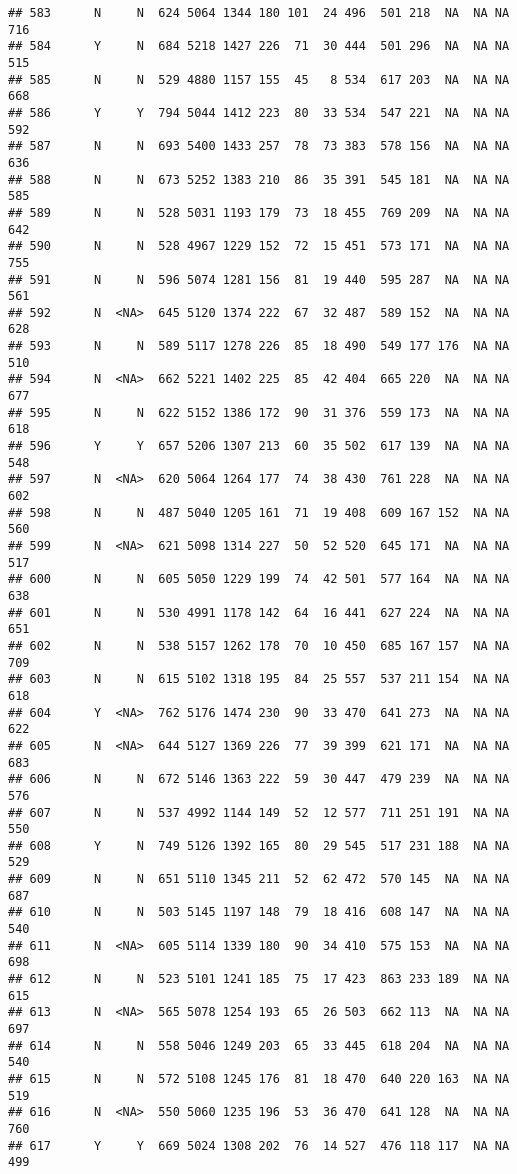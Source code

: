 \documentclass[]{article}
\begin{document}
\begin{verbatim}
## 583      N     N  624 5064 1344 180 101  24 496  501 218  NA  NA NA  716
## 584      Y     N  684 5218 1427 226  71  30 444  501 296  NA  NA NA  515
## 585      N     N  529 4880 1157 155  45   8 534  617 203  NA  NA NA  668
## 586      Y     Y  794 5044 1412 223  80  33 534  547 221  NA  NA NA  592
## 587      N     N  693 5400 1433 257  78  73 383  578 156  NA  NA NA  636
## 588      N     N  673 5252 1383 210  86  35 391  545 181  NA  NA NA  585
## 589      N     N  528 5031 1193 179  73  18 455  769 209  NA  NA NA  642
## 590      N     N  528 4967 1229 152  72  15 451  573 171  NA  NA NA  755
## 591      N     N  596 5074 1281 156  81  19 440  595 287  NA  NA NA  561
## 592      N  <NA>  645 5120 1374 222  67  32 487  589 152  NA  NA NA  628
## 593      N     N  589 5117 1278 226  85  18 490  549 177 176  NA NA  510
## 594      N  <NA>  662 5221 1402 225  85  42 404  665 220  NA  NA NA  677
## 595      N     N  622 5152 1386 172  90  31 376  559 173  NA  NA NA  618
## 596      Y     Y  657 5206 1307 213  60  35 502  617 139  NA  NA NA  548
## 597      N  <NA>  620 5064 1264 177  74  38 430  761 228  NA  NA NA  602
## 598      N     N  487 5040 1205 161  71  19 408  609 167 152  NA NA  560
## 599      N  <NA>  621 5098 1314 227  50  52 520  645 171  NA  NA NA  517
## 600      N     N  605 5050 1229 199  74  42 501  577 164  NA  NA NA  638
## 601      N     N  530 4991 1178 142  64  16 441  627 224  NA  NA NA  651
## 602      N     N  538 5157 1262 178  70  10 450  685 167 157  NA NA  709
## 603      N     N  615 5102 1318 195  84  25 557  537 211 154  NA NA  618
## 604      Y  <NA>  762 5176 1474 230  90  33 470  641 273  NA  NA NA  622
## 605      N  <NA>  644 5127 1369 226  77  39 399  621 171  NA  NA NA  683
## 606      N     N  672 5146 1363 222  59  30 447  479 239  NA  NA NA  576
## 607      N     N  537 4992 1144 149  52  12 577  711 251 191  NA NA  550
## 608      Y     N  749 5126 1392 165  80  29 545  517 231 188  NA NA  529
## 609      N     N  651 5110 1345 211  52  62 472  570 145  NA  NA NA  687
## 610      N     N  503 5145 1197 148  79  18 416  608 147  NA  NA NA  540
## 611      N  <NA>  605 5114 1339 180  90  34 410  575 153  NA  NA NA  698
## 612      N     N  523 5101 1241 185  75  17 423  863 233 189  NA NA  615
## 613      N  <NA>  565 5078 1254 193  65  26 503  662 113  NA  NA NA  697
## 614      N     N  558 5046 1249 203  65  33 445  618 204  NA  NA NA  540
## 615      N     N  572 5108 1245 176  81  18 470  640 220 163  NA NA  519
## 616      N  <NA>  550 5060 1235 196  53  36 470  641 128  NA  NA NA  760
## 617      Y     Y  669 5024 1308 202  76  14 527  476 118 117  NA NA  499

\end{verbatim}
\end{document}
